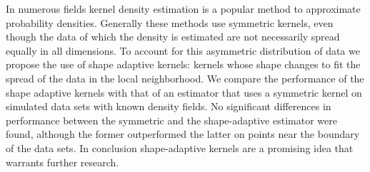 \noindent In numerous fields kernel density estimation is a popular method to approximate probability densities.
Generally these methods use symmetric kernels, even though the data of which the density is estimated are not necessarily spread equally in all dimensions. To account for this asymmetric distribution of data we propose the use of shape adaptive kernels: kernels whose shape changes to fit the spread of the data in the local neighborhood.
We compare the performance of the shape adaptive kernels with that of an estimator that uses a symmetric kernel on simulated data sets with known density fields.
No significant differences in performance between the symmetric and the shape-adaptive estimator were found, although the former outperformed the latter on points near the boundary of the data sets.  
In conclusion shape-adaptive kernels are a promising idea that warrants further research.
